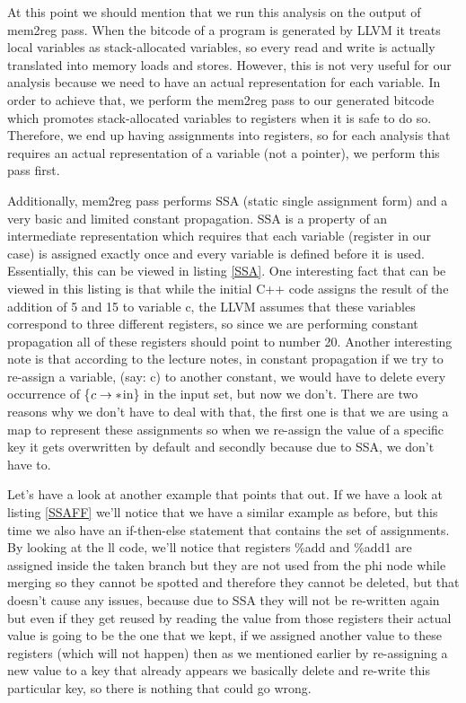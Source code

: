 At this point we should mention that we run this analysis on the output of mem2reg pass. When the bitcode of a program is generated by LLVM it  treats local variables as stack-allocated variables, so every read and write is actually translated into memory loads and stores. However, this is not very useful for our analysis because we need to have an actual representation for each variable. In order to achieve that, we perform the mem2reg pass to our generated bitcode which promotes stack-allocated variables to registers when it is safe to do so. Therefore, we end up having assignments into registers, so for each analysis that requires an actual representation of a variable (not a pointer), we perform this pass first. 

Additionally, mem2reg pass performs SSA (static single assignment form) and a very basic and limited constant propagation. SSA is a property of an intermediate representation which requires that each variable (register in our case) is assigned exactly once and every variable is defined before it is used. Essentially, this can be viewed in listing \ref{SSA}. One interesting fact that can be viewed in this listing is that while the initial C++ code assigns the result of the addition of 5 and 15 to variable c, the LLVM assumes that these variables correspond to three different registers, so since we are performing constant propagation all of these registers should point to number 20. Another interesting note is that according to the lecture notes, in constant propagation if we try to re-assign a variable, (say: c) to another constant, we would have to delete every occurrence of \{$c\rightarrow*$in\} in the input set, but now we don't. There are two reasons why we don't have to deal with that, the first one is that we are using a map to represent these assignments so when we re-assign the value of a specific key it gets overwritten by default and secondly because due to SSA, we don't have to. 


Let's have a look at another example that points that out. If we have a look at listing \ref{SSAFF} we'll notice that we have a similar example as before, but this time we also have an if-then-else statement that contains the set of assignments. By looking at the ll code, we'll notice that registers \%add and \%add1 are assigned inside the taken branch but they are not used from the phi node while merging so they cannot be spotted and therefore they cannot be deleted, but that doesn't cause any issues, because due to SSA they will not be re-written again but even if they get reused by reading the value from those registers their actual value is going to be the one that we kept, if we assigned another value to these registers (which will not happen) then as we mentioned earlier by re-assigning a new value to a key that already appears we basically delete and re-write this particular key, so there is nothing that could go wrong.

